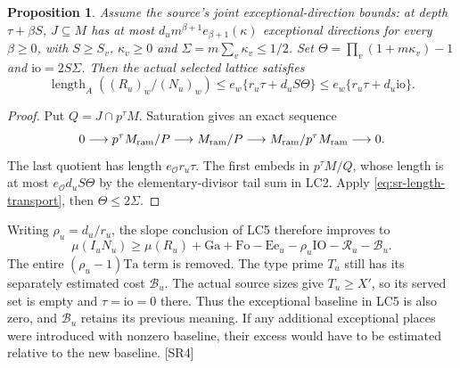 \documentclass[11pt,a4paper]{article}
\numberwithin{equation}{section}
\newtheorem{proposition}[theorem]{Proposition}
\theoremstyle{remark}\newtheorem{remark}[theorem]{Remark}
\begin{document}
\begin{proposition}\label{prop:sr-actual-index}
Assume the source's joint exceptional-direction bounds: at depth
$\tau+\beta S$, $J\subseteq M$ has at most
$d_u m^{\beta+1}e_{\beta+1}(\kappa)$ exceptional directions for every
$\beta\ge0$, with $S\ge S_v$, $\kappa_v\ge0$ and
$\Sigma=m\sum_v\kappa_v\le1/2$.
Set $\Theta=\prod_v(1+m\kappa_v)-1$ and $\mathrm{io}=2S\Sigma$.
Then the actual selected lattice satisfies
\begin{equation}\label{eq:sr-index}
 \operatorname{length}_{A}((R_u)_w/(N_u)_w)
 \le e_w\{r_u\tau+d_uS\Theta\}
 \le e_w\{r_u\tau+d_u\mathrm{io}\}.
\end{equation}
\end{proposition}

\begin{proof}
Put $Q=J\cap p^\tau M$. Saturation gives an exact sequence
\[
 0\longrightarrow p^\tau M_{\rm ram}/P
 \longrightarrow M_{\rm ram}/P
 \longrightarrow M_{\rm ram}/p^\tau M_{\rm ram}\longrightarrow0.
\]
The last quotient has length $e_{\mathcal O}r_u\tau$.
The first embeds in $p^\tau M/Q$, whose length is at most
$e_{\mathcal O}d_uS\Theta$ by the elementary-divisor tail sum in LC2.
Apply \eqref{eq:sr-length-transport}, then $\Theta\le2\Sigma$.
\end{proof}

Writing $\rho_u=d_u/r_u$, the slope conclusion of LC5 therefore improves to
\begin{equation}\label{eq:sr-slope}
 \mu(I_uN_u)\ge\mu(R_u)+\mathrm{Ga}+\mathrm{Fo}-\mathrm{Ee}_u
 -\rho_u\mathrm{IO}-\mathcal R_u-\mathcal B_u.
\end{equation}
The entire $(\rho_u-1)\mathrm{Ta}$ term is removed. The type prime
$T_u$ still has its separately estimated cost $\mathcal B_u$.
The actual source sizes give $T_u\ge X'$, so its served set is empty and
$\tau=\mathrm{io}=0$ there. Thus the exceptional baseline in LC5 is also
zero, and $\mathcal B_u$ retains its previous meaning. If any additional
exceptional places were introduced with nonzero baseline, their excess
would have to be estimated relative to the new baseline. \textsf{[SR4]}
\end{document}
